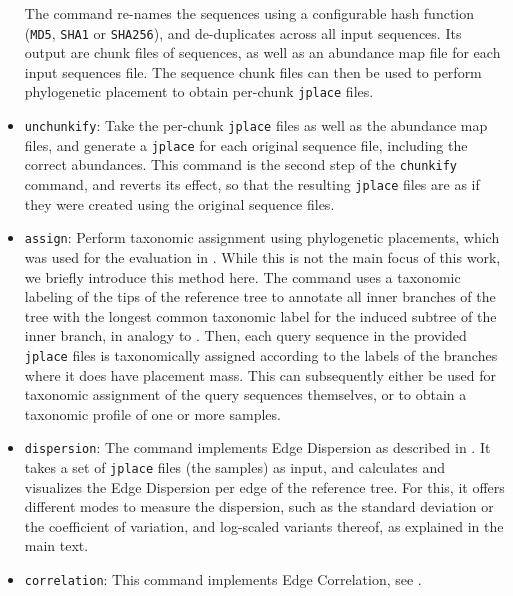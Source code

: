 \begin{itemize}
          The command re-names the sequences using a configurable hash function (\texttt{MD5}, \texttt{SHA1} or \texttt{SHA256}),
          and de-duplicates across all input sequences.
          Its output are chunk files of sequences, as well as an abundance map file for each input sequences file.
          The sequence chunk files can then be used to perform phylogenetic placement
          to obtain per-chunk \texttt{jplace} files.
    \item \texttt{unchunkify}: Take the per-chunk \texttt{jplace} files as well as the abundance map files,
          and generate a \texttt{jplace} for each original sequence file, including the correct abundances.
          This command is the second step of the \texttt{chunkify} command, and reverts its effect,
          so that the resulting \texttt{jplace} files are as if they were created using the original sequence files.
    \item \texttt{assign}: Perform taxonomic assignment using phylogenetic placements,
          which was used for the evaluation in .
          While this is not the main focus of this work, we briefly introduce this method here.
          The command uses a taxonomic labeling of the tips of the reference tree
          to annotate all inner branches of the tree with the longest common taxonomic label
          for the induced subtree of the inner branch, in analogy to  \cite{Kozlov2016}.
          Then, each query sequence in the provided \texttt{jplace} files
          is taxonomically assigned according to the labels of the branches where it does have placement mass.
          This can subsequently either be used for taxonomic assignment of the query sequences themselves,
          or to obtain a taxonomic profile of one or more samples.
    \item \texttt{dispersion}: The command implements Edge Dispersion
          as described in .
          It takes a set of \texttt{jplace} files (the samples) as input, and calculates and visualizes
          the Edge Dispersion per edge of the reference tree.
          For this, it offers different modes to measure the dispersion, such as the standard deviation
          or the coefficient of variation, and log-scaled variants thereof, as explained in the main text.
    \item \texttt{correlation}: This command implements Edge Correlation,
          see .

\end{itemize}
